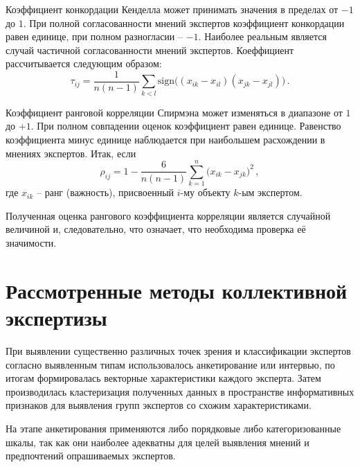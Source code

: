 \documentclass[a4paper,12pt]{extreport}
\begin{document}
Коэффициент конкордации Кенделла может принимать значения в пределах от $-1$ до $1$.
При полной согласованности мнений экспертов коэффициент конкордации равен единице,
при полном разногласии -- $-1$. Наиболее реальным является случай частичной
согласованности мнений экспертов. Коеффициент рассчитывается следующим образом:
\[ \tau_{ij} = \frac{1}{n(n-1)} \sum_{k<l}
\text{sign}\bigl((x_{ik}-x_{il})(x_{jk}-x_{jl})\bigr)\,. \]

Коэффициент ранговой корреляции Спирмэна может изменяться в диапазоне от $1$ до $+1$. При полном совпадении оценок коэффициент равен единице. Равенство коэффициента минус единице наблюдается при наибольшем расхождении в мнениях экспертов. Итак, если 
\[\rho_{ij} = 1-\frac{6}{n(n-1)}\sum_{k=1}^n \bigl( x_{ik} - x_{jk}\bigr)^2\,,\]
где $x_{ik}$ – ранг (важность), присвоенный $i$-му объекту $k$-ым экспертом.

Полученная оценка рангового коэффициента корреляции является случайной величиной и,
следовательно, что означает, что необходима проверка её значимости.


\section*{Рассмотренные методы коллективной экспертизы} %
\label{sec:Collective_expertese}


При выявлении существенно различных точек зрения и классификации экспертов
согласно выявленным типам использовалось анкетирование или интервью, по итогам
формировалась векторные характеристики каждого эксперта. Затем производилась
кластеризация полученных данных в пространстве информативных признаков для выявления
групп экспертов со схожим характеристиками.

На этапе анкетирования применяются либо порядковые либо категоризованные шкалы, так как
они наиболее адекватны для целей выявления мнений и предпочтений опрашиваемых экспертов.


\end{document}
